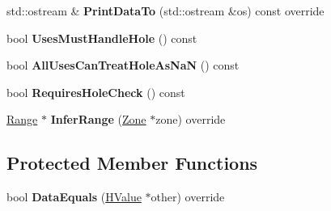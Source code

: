 \begin{DoxyCompactItemize}
\item 
std\+::ostream \& {\bfseries Print\+Data\+To} (std\+::ostream \&os) const  override\hypertarget{classv8_1_1internal_1_1_h_load_keyed_a3f13d0fcf9ee66bed2dabd5a8c6ca71b}{}\label{classv8_1_1internal_1_1_h_load_keyed_a3f13d0fcf9ee66bed2dabd5a8c6ca71b}

\item 
bool {\bfseries Uses\+Must\+Handle\+Hole} () const \hypertarget{classv8_1_1internal_1_1_h_load_keyed_ac73ab37f689d1a2207825ae1b7e5ca94}{}\label{classv8_1_1internal_1_1_h_load_keyed_ac73ab37f689d1a2207825ae1b7e5ca94}

\item 
bool {\bfseries All\+Uses\+Can\+Treat\+Hole\+As\+NaN} () const \hypertarget{classv8_1_1internal_1_1_h_load_keyed_a3878ef3fec341735360d5741532745c8}{}\label{classv8_1_1internal_1_1_h_load_keyed_a3878ef3fec341735360d5741532745c8}

\item 
bool {\bfseries Requires\+Hole\+Check} () const \hypertarget{classv8_1_1internal_1_1_h_load_keyed_a8aaa0e8483728585976500b2188bf64e}{}\label{classv8_1_1internal_1_1_h_load_keyed_a8aaa0e8483728585976500b2188bf64e}

\item 
\hyperlink{classv8_1_1internal_1_1_range}{Range} $\ast$ {\bfseries Infer\+Range} (\hyperlink{classv8_1_1internal_1_1_zone}{Zone} $\ast$zone) override\hypertarget{classv8_1_1internal_1_1_h_load_keyed_a99cbd23628264d9a3c7de21633a421b6}{}\label{classv8_1_1internal_1_1_h_load_keyed_a99cbd23628264d9a3c7de21633a421b6}

\end{DoxyCompactItemize}
\subsection*{Protected Member Functions}
\begin{DoxyCompactItemize}
\item 
bool {\bfseries Data\+Equals} (\hyperlink{classv8_1_1internal_1_1_h_value}{H\+Value} $\ast$other) override\hypertarget{classv8_1_1internal_1_1_h_load_keyed_a932f795266d51a811eaf54dfd364384f}{}\label{classv8_1_1internal_1_1_h_load_keyed_a932f795266d51a811eaf54dfd364384f}

\end{DoxyCompactItemize}
